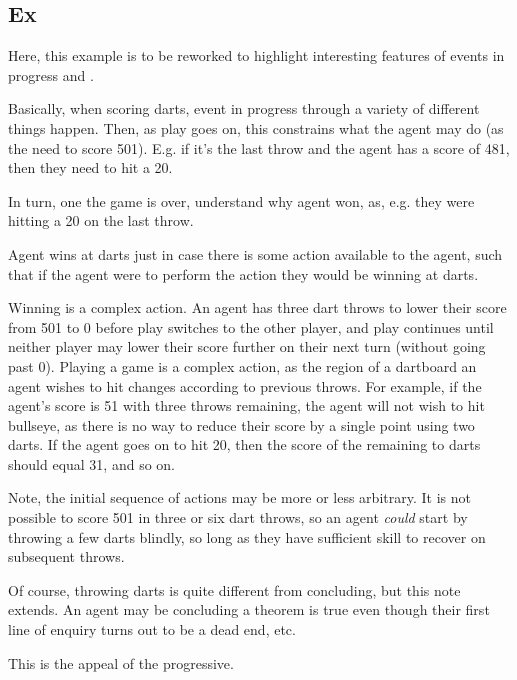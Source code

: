 \subsection{Ex}

{
  \color{red}
  Here, this example is to be reworked to highlight interesting features of events in progress and \progEx{}.

  Basically, when scoring darts, event in progress through a variety of different things happen.
  Then, as play goes on, this constrains what the agent may do (as the need to score 501).
  E.g. if it's the last throw and the agent has a score of 481, then they need to hit a 20.

  In turn, one the game is over, understand why agent won, as, e.g. they were hitting a 20 on the last throw.
}

\begin{note}
  \begin{illustration}[Darts]
    Agent wins at darts just in case there is some action available to the agent, such that if the agent were to perform the action they would be winning at darts.

    Winning is a complex action.
    An agent has three dart throws to lower their score from 501 to 0 before play switches to the other player, and play continues until neither player may lower their score further on their next turn (without going past 0).
    Playing a game is a complex action, as the region of a dartboard an agent wishes to hit changes according to previous throws.
    For example, if the agent's score is 51 with three throws remaining, the agent will not wish to hit bullseye, as there is no way to reduce their score by a single point using two darts.
    If the agent goes on to hit 20, then the score of the remaining to darts should equal 31, and so on.
  \end{illustration}

  Note, the initial sequence of actions may be more or less arbitrary.
  It is not possible to score 501 in three or six dart throws, so an agent \emph{could} start by throwing a few darts blindly, so long as they have sufficient skill to recover on subsequent throws.

  Of course, throwing darts is quite different from concluding, but this note extends.
  An agent may be concluding a theorem is true even though their first line of enquiry turns out to be a dead end, etc.

  This is the appeal of the progressive.
\end{note}






